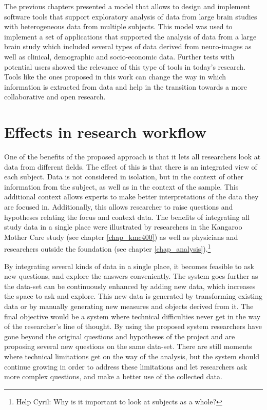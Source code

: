 The previous chapters presented a model that allows to design and implement software tools that support exploratory analysis of data from large brain studies with heterogeneous data from multiple subjects. This model was used to implement a set of applications that supported the analysis of data from a large brain study which included several types of data derived from neuro-images as well as clinical, demographic and socio-economic data. Further tests with potential users showed the relevance of this type of tools in today's research. Tools like the ones proposed in this work can change the way in which information is extracted from data and help in the transition towards a more collaborative and open research. 

\section{Effects in research workflow}



One of the benefits of the proposed approach is that it lets all researchers look at data from different fields. The effect of this is that there is an integrated view of each subject. Data is not considered in isolation, but in the context of other information from the subject, as well as in the context of the sample. This additional context allows experts to make better interpretations of the data they are focused in. Additionally, this allows researcher to raise questions and hypotheses relating the focus and context data. The benefits of integrating all study data in a single place were illustrated by researchers in the Kangaroo Mother Care study (see chapter \ref{chap_kmc400}) as well as physicians and researchers outside the foundation (see chapter \ref{chap_analysis}).\footnote{Help Cyril: Why is it important to look at subjects as a whole?} 

By integrating several kinds of data in a single place, it becomes feasible to ask new questions, and explore the answers conveniently. The system goes further as the data-set can be continuously enhanced by adding new data, which increases the space to ask and explore. This new data is generated by transforming existing data or by manually generating new measures and objects derived from it. The final objective would be a system where technical difficulties never get in the way of the researcher's line of thought. By using the proposed system researchers have gone beyond the original questions and hypotheses of the project and are proposing several new questions on the same data-set. There are still moments where technical limitations get on the way of the analysis, but the system should continue growing in order to address these limitations and let researchers ask more complex questions, and make a better use of the collected data.

